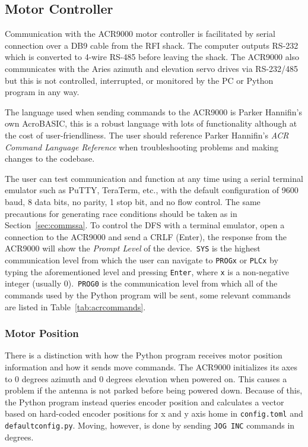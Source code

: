 \documentclass[titlepage]{article}
\begin{document}
\subsection{Motor Controller}\label{sec:commsmc}
Communication with the ACR9000 motor controller is facilitated by serial connection over a DB9 cable from the RFI shack. The computer outputs RS-232 which is converted to 4-wire RS-485 before leaving the shack. The ACR9000 also communicates with the Aries azimuth and elevation servo drives via RS-232/485 but this is not controlled, interrupted, or monitored by the PC or Python program in any way.

The language used when sending commands to the ACR9000 is Parker Hannifin's own AcroBASIC, this is a robust language with lots of functionality although at the cost of user-friendliness. The user should reference Parker Hannifin's \textit{ACR Command Language Reference} when troubleshooting problems and making changes to the codebase.

The user can test communication and function at any time using a serial terminal emulator such as PuTTY, TeraTerm, etc., with the default configuration of 9600 baud, 8 data bits, no parity, 1 stop bit, and no flow control. The same precautions for generating race conditions should be taken as in Section~\ref{sec:commssa}. To control the DFS with a terminal emulator, open a connection to the ACR9000 and send a CRLF (Enter), the response from the ACR9000 will show the \textit{Prompt Level} of the device.\ \verb|SYS| is the highest communication level from which the user can navigate to \verb|PROGx| or \verb|PLCx| by typing the aforementioned level and pressing \verb|Enter|, where \verb|x| is a non-negative integer (usually 0).\ \verb|PROG0| is the communication level from which all of the commands used by the Python program will be sent, some relevant commands are listed in Table~\ref{tab:acrcommands}.

\subsubsection{Motor Position}
There is a distinction with how the Python program receives motor position information and how it sends move commands. The ACR9000 initializes its axes to 0 degrees azimuth and 0 degrees elevation when powered on. This causes a problem if the antenna is not parked before being powered down. Because of this, the Python program instead queries encoder position and calculates a vector based on hard-coded encoder positions for x and y axis home in \verb|config.toml| and \verb|defaultconfig.py|. Moving, however, is done by sending \verb|JOG INC| commands in degrees.
\end{document}
